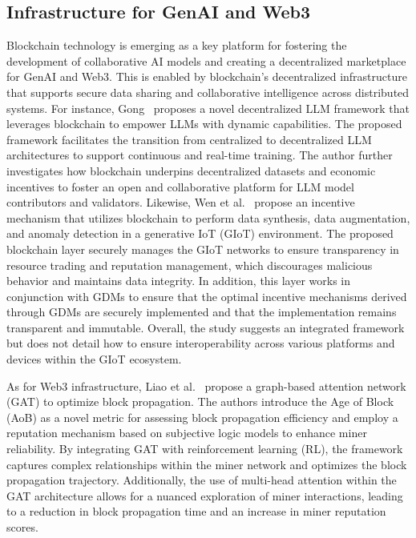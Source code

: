 \documentclass[5p,twocolumn]{elsarticle}
\begin{document}
\subsection{Infrastructure for GenAI and Web3}
Blockchain technology is emerging as a key platform for fostering the development of collaborative AI models and creating a decentralized marketplace for GenAI and Web3. This is enabled by blockchain's decentralized infrastructure that supports secure data sharing and collaborative intelligence across distributed systems. For instance, Gong~\cite{gong2023dynamic} proposes a novel decentralized LLM framework that leverages blockchain to empower LLMs with dynamic capabilities. The proposed framework facilitates the transition from centralized to decentralized LLM architectures to support continuous and real-time training. The author further investigates how blockchain underpins decentralized datasets and economic incentives to foster an open and collaborative platform for LLM model contributors and validators. Likewise, Wen et al.~\cite{wen2024generative} propose an incentive mechanism that utilizes blockchain to perform data synthesis, data augmentation, and anomaly detection in a generative IoT (GIoT) environment. The proposed blockchain layer securely manages the GIoT networks to ensure transparency in resource trading and reputation management, which discourages malicious behavior and maintains data integrity. In addition, this layer works in conjunction with GDMs to ensure that the optimal incentive mechanisms derived through GDMs are securely implemented and that the implementation remains transparent and immutable. Overall, the study suggests an integrated framework but does not detail how to ensure interoperability across various platforms and devices within the GIoT ecosystem.

As for Web3 infrastructure, Liao et al.~\cite{liao2024graph} propose a graph-based attention network (GAT) to optimize block propagation. The authors introduce the Age of Block (AoB) as a novel metric for assessing block propagation efficiency and employ a reputation mechanism based on subjective logic models to enhance miner reliability. By integrating GAT with reinforcement learning (RL), the framework captures complex relationships within the miner network and optimizes the block propagation trajectory. Additionally, the use of multi-head attention within the GAT architecture allows for a nuanced exploration of miner interactions, leading to a reduction in block propagation time and an increase in miner reputation scores.
\end{document}
